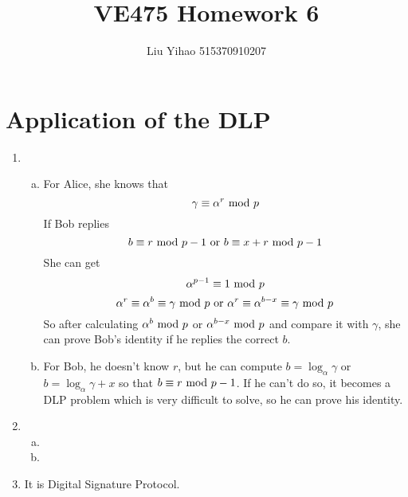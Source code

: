 \documentclass{article}
\title{VE475 Homework 6}
\author{Liu Yihao 515370910207}
\date{}
\renewcommand{\mod}{{\rm\ mod\ }}
\begin{document}
\maketitle

\section{Application of the DLP}
\begin{enumerate}
\item
\begin{enumerate}[(a)]
\item
For Alice, she knows that $$\gamma\equiv\alpha^r\mod p$$
If Bob replies $$b\equiv r\mod p-1{\rm\ or\ }b\equiv x+r\mod p-1$$
She can get $$\alpha^{p-1}\equiv 1\mod p$$
$$\alpha^r\equiv\alpha^b\equiv\gamma\mod p{\rm\ or\ }\alpha^r\equiv\alpha^{b-x}\equiv\gamma\mod p$$
So after calculating $\alpha^b\mod p$ or $\alpha^{b-x}\mod p$ and compare it with $\gamma$, she can prove Bob's identity if he replies the correct $b$.
\item 
For Bob, he doesn't know $r$, but he can compute $b=\log_\alpha\gamma$ or $b=\log_\alpha\gamma+x$ so that $b\equiv r\mod p-1$. If he can't do so, it becomes a DLP problem which is very difficult to solve, so he can prove his identity.
\end{enumerate}
\item
\begin{enumerate}[(a)]
\item
\item
\end{enumerate}
\item
It is Digital Signature Protocol.
\end{enumerate}
\end{document}
